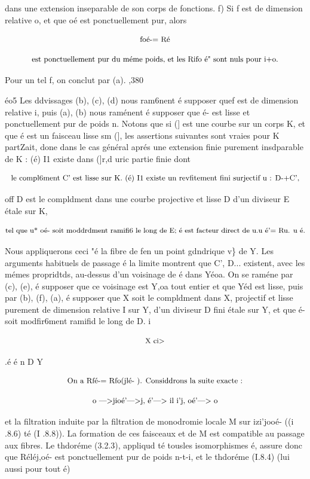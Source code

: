 \documentclass[11pt]{article}
\theoremstyle{remark}
\begin{document}
dans une extension inseparable de son corps de fonctions. f) Si f est de dimension relative o, et que oé est ponctuellement pur, alors

\[\text{\small foé-= Ré}\]

\[\text{\small est ponctuellement pur du méme poids, et les Rifo é" sont nuls pour i+o.}\]

Pour un tel f, on conclut par (a). ,380

éo5 Les ddvissages (b), (c), (d) nous ram6nent é supposer quef est de dimension relative i, puis (a), (b) nous raménent é supposer que é- est lisse et ponctuellement pur de poids n. Notons que si (] est une courbe sur un corps K, et que é est un faisceau lisse sm (], les assertions suivantes sont vraies pour K partZait, done dans le cas général aprés une extension finie purement insdparable de K : (é) I1 existe dans (]r,d uric partie finie dont

\[\text{\small le compl6ment C' est lisse sur K. (é) I1 existe un revfitement fini surjectif u : D-+C',}\]

off D est le compldment dans une courbe projective et lisse D d'un diviseur E étale sur K,

\[\text{\small tel que u* oé- soit moddrdment ramifi6 le long de E; é est facteur direct de u.u é'= Ru. u é.}\]

Nous appliquerons ceci "é la fibre de fen un point gdndrique v\} de Y. Les arguments habituels de passage é la limite montrent que C', D... existent, avec les mémes propridtds, au-dessus d'un voisinage de é dans Yéoa. On se raméne par (c), (e), é supposer que ce voisinage est Y,oa tout entier et que Yéd est lisse, puis par (b), (f), (a), é supposer que X soit le compldment dans X, projectif et lisse purement de dimension relative I sur Y, d'un diviseur D fini étale sur Y, et que é- soit modfir6ment ramifid le long de D. i

\[\text{\small X ci>}\]

.é é n D Y

\[\text{\small On a Rfé-= Rfo(jlé- ). Considdrons la suite exacte :}\]

\[\text{\small o --->jioé'--->j, é'---> il i'j, oé'---> o}\]

et la filtration induite par la filtration de monodromie locale M sur izi'jooé- ((i .8.6) té (I .8.8)). La formation de ces faisceaux et de M est compatible au passage aux fibres. Le thdoréme (3.2.3), appliqud té tousles isomorphismes é, assure donc que Réléj,oé- est ponctuellement pur de poids n-t-i, et le thdoréme (I.8.4) (lui aussi pour tout é)
\end{document}
